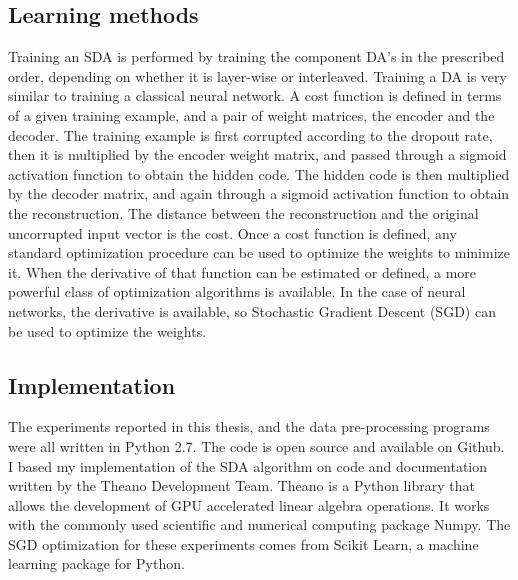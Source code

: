 \documentclass[12pt]{article}
\begin{document}
\begin{doublespacing}
	\subsection{Learning methods}
	Training an SDA is performed by training the component DA's in the prescribed order, depending on whether it is layer-wise or interleaved. Training a DA is very similar to training a classical neural network. A cost function is defined in terms of a given training example, and a pair of weight matrices, the encoder and the decoder. The training example is first corrupted according to the dropout rate, then it is multiplied by the encoder weight matrix, and passed through a sigmoid activation function to obtain the hidden code. The hidden code is then multiplied by the decoder matrix, and again through a sigmoid activation function to obtain the reconstruction. The distance between the reconstruction and the original uncorrupted input vector is the cost. Once a cost function is defined, any standard optimization procedure can be used to optimize the weights to minimize it. When the derivative of that function can be estimated or defined, a more powerful class of optimization algorithms is available. In the case of neural networks, the derivative is available, so Stochastic Gradient Descent (SGD) can be used to optimize the weights. 

	\subsection{Implementation} 
	The experiments reported in this thesis, and the data pre-processing programs were all written in Python 2.7. The code is open source and available on Github\cite{nifong13}.  I based my implementation of the SDA algorithm on code and documentation written by the Theano Development Team. Theano is a Python library that allows the development of GPU accelerated linear algebra operations. It works with the commonly used scientific and numerical computing package Numpy. The SGD optimization for these experiments comes from Scikit Learn, a machine learning package for Python.


\end{doublespacing}
\end{document}
